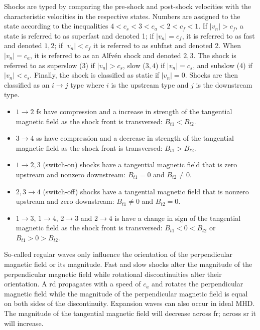 Shocks are typed by comparing the pre-shock and post-shock velocities with the characteristic velocities in the respective states.  Numbers are assigned to the state according to the inequalities $4 < c_s < 3 < c_a < 2 < c_f < 1$.  If $|{v_n}| > c_f$, a state is referred to as superfast and denoted 1; if $|{v_n}| = c_f$, it is referred to as fast and denoted $1,2$; if $|{v_n}| < c_f$ it is referred to as subfast and denoted 2.  When $|{v_n}| = c_a$, it is referred to as an Alfv{\'e}n shock and denoted $2,3$.  The shock is referred to as superslow (3) if $|{v_n}| > c_s$, slow ($3,4$) if $|{v_n}| = c_s$, and subslow (4) if $|{v_n}| < c_s$.  Finally, the shock is classified as static if $|{v_n}| = 0$.  Shocks are then classified as an $i \rightarrow j$ type where $i$ is the upstream type and $j$ is the downstream type.  
\begin{itemize}
\item $1 \rightarrow 2$  \gls{fs} have compression and a increase in strength of the tangential magnetic field as the shock front is transversed: $B_{t1} < B_{t2}$.
\item $3 \rightarrow 4$ \gls{ss} have compression and a decrease in strength of the tangential magnetic field as the shock front is transversed: $B_{t1} > B_{t2}$.
\item $1 \rightarrow 2,3$ (switch-on) shocks have a tangential magnetic field that is zero upstream and nonzero downstream: $B_{t1} = 0$ and $B_{t2} \ne 0$.
\item $2,3 \rightarrow 4$ (switch-off) shocks have a tangential magnetic field that is nonzero upstream and zero downstream: $B_{t1} \ne 0$ and $B_{t2} = 0$.
\item $1 \rightarrow 3$, $1 \rightarrow 4$, $2 \rightarrow 3$ and $2 \rightarrow 4$ \gls{is} have a change in sign of the tangential magnetic field as the shock front is transversed: $B_{t1} < 0 < B_{t2}$ or $B_{t1} > 0 > B_{t2}$.
\end{itemize}

So-called regular waves only influence the orientation of the perpendicular magnetic field or its magnitude.  Fast and slow shocks alter the magnitude of the perpendicular magnetic field while rotational discontinuities alter their orientation.  A \gls{rd} propagates with a speed of $c_a$ and rotates the perpendicular magnetic field while the magnitude of the perpendicular magnetic field is equal on both sides of the discontinuity.  Expansion waves can also occur in ideal MHD.  The magnitude of the tangential magnetic field will decrease across \gls{fr}; across \gls{sr} it will increase.

